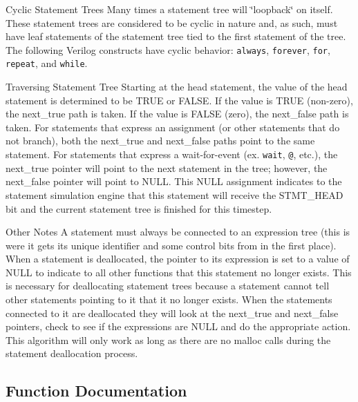 \begin{Desc}
\item[Cyclic Statement Trees]Many times a statement tree will \char`\"{}loopback\char`\"{} on itself. These statement trees are considered to be cyclic in nature and, as such, must have leaf statements of the statement tree tied to the first statement of the tree. The following Verilog constructs have cyclic behavior: {\tt always}, {\tt forever}, {\tt for}, {\tt repeat}, and {\tt while}.\end{Desc}
\begin{Desc}
\item[Traversing Statement Tree]Starting at the head statement, the value of the head statement is determined to be TRUE or FALSE. If the value is TRUE (non-zero), the next\_\-true path is taken. If the value is FALSE (zero), the next\_\-false path is taken. For statements that express an assignment (or other statements that do not branch), both the next\_\-true and next\_\-false paths point to the same statement. For statements that express a wait-for-event (ex. {\tt wait}, {\tt @}, etc.), the next\_\-true pointer will point to the next statement in the tree; however, the next\_\-false pointer will point to NULL. This NULL assignment indicates to the statement simulation engine that this statement will receive the STMT\_\-HEAD bit and the current statement tree is finished for this timestep.\end{Desc}
\begin{Desc}
\item[Other Notes]A statement must always be connected to an expression tree (this is were it gets its unique identifier and some control bits from in the first place). When a statement is deallocated, the pointer to its expression is set to a value of NULL to indicate to all other functions that this statement no longer exists. This is necessary for deallocating statement trees because a statement cannot tell other statements pointing to it that it no longer exists. When the statements connected to it are deallocated they will look at the next\_\-true and next\_\-false pointers, check to see if the expressions are NULL and do the appropriate action. This algorithm will only work as long as there are no malloc calls during the statement deallocation process.\end{Desc}


\subsection{Function Documentation}
